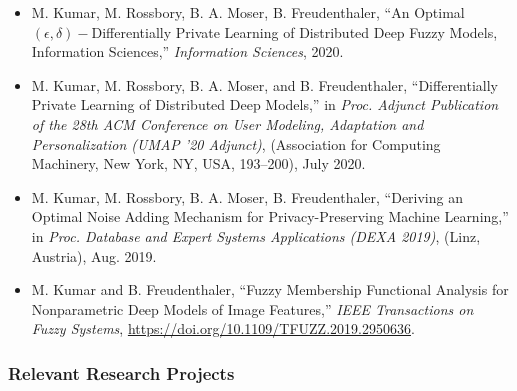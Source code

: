 \documentclass[a4paper,11pt]{article}
\begin{document}
\begin{itemize}
\item M. Kumar, M. Rossbory, B. A. Moser, B. Freudenthaler, ``An Optimal $(\epsilon,\delta)-$Differentially Private Learning of Distributed Deep Fuzzy Models,
Information Sciences,'' \emph{Information Sciences}, 2020.
\item M. Kumar, M. Rossbory, B. A. Moser, and B. Freudenthaler, ``Differentially Private Learning of Distributed Deep Models,'' in \emph{Proc. Adjunct Publication of the 28th ACM Conference on User Modeling, Adaptation and Personalization (UMAP ’20 Adjunct)}, (Association for Computing Machinery, New York, NY, USA, 193–200), July 2020. 
\item M. Kumar, M. Rossbory, B. A. Moser, B. Freudenthaler, ``Deriving an Optimal Noise Adding Mechanism for Privacy-Preserving Machine Learning,'' in \emph{Proc. Database and Expert Systems Applications (DEXA 2019)}, (Linz, Austria), Aug. 2019.   
\item M. Kumar and B. Freudenthaler, ``Fuzzy Membership Functional Analysis for Nonparametric Deep Models of Image Features,'' \emph{IEEE Transactions on Fuzzy Systems}, {\href{https://doi.org/10.1109/TFUZZ.2019.2950636}{https://doi.org/10.1109/TFUZZ.2019.2950636}}.
\end{itemize}

\subsubsection*{Relevant Research Projects}
\end{document}
